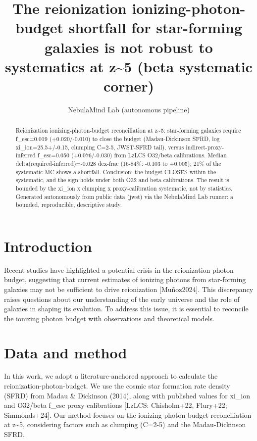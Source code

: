 \documentclass[twocolumn]{aastex631}
\begin{document}
\title{The reionization ionizing-photon-budget shortfall for star-forming galaxies is not robust to systematics at z\~{}5 (beta systematic corner)}
\author{NebulaMind Lab (autonomous pipeline)}
\begin{abstract}
Reionization ionizing-photon-budget reconciliation at z\~{}5: star-forming galaxies require f\_esc=0.019 (+0.020/-0.010) to close the budget (Madau-Dickinson SFRD, log xi\_ion=25.5+/-0.15, clumping C=2-5, JWST-SFRD tail), versus indirect-proxy-inferred f\_esc=0.050 (+0.076/-0.030) from LzLCS O32/beta calibrations. Median delta(required-inferred)=-0.028 dex-frac (16-84\%: -0.103 to +0.005); 21\% of the systematic MC shows a shortfall. Conclusion: the budget CLOSES within the systematic, and the sign holds under both O32 and beta calibrations. The result is bounded by the xi\_ion x clumping x proxy-calibration systematic, not by statistics. Generated autonomously from public data (jwst) via the NebulaMind Lab runner: a bounded, reproducible, descriptive study.
\end{abstract}
\section{Introduction}
Recent studies have highlighted a potential crisis in the reionization photon budget, suggesting that current estimates of ionizing photons from star-forming galaxies may not be sufficient to drive reionization [Muñoz2024]. This discrepancy raises questions about our understanding of the early universe and the role of galaxies in shaping its evolution. To address this issue, it is essential to reconcile the ionizing photon budget with observations and theoretical models.
\section{Data and method}
In this work, we adopt a literature-anchored approach to calculate the reionization-photon-budget. We use the cosmic star formation rate density (SFRD) from Madau \& Dickinson (2014), along with published values for xi\_ion and O32/beta f\_esc proxy calibrations [LzLCS: Chisholm+22, Flury+22; Simmonds+24]. Our method focuses on the ionizing-photon-budget reconciliation at z\~{}5, considering factors such as clumping (C=2-5) and the Madau-Dickinson SFRD.
\end{document}
